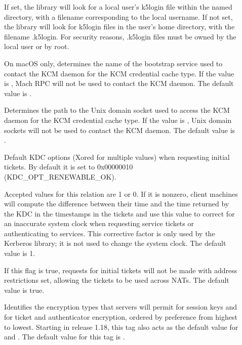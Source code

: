 \documentclass[letterpaper,10pt,english]{sphinxmanual}
\begin{document}
\begin{description}
\item[{}] \leavevmode
If set, the library will look for a local user’s k5login file
within the named directory, with a filename corresponding to the
local username.  If not set, the library will look for k5login
files in the user’s home directory, with the filename .k5login.
For security reasons, .k5login files must be owned by
the local user or by root.

\item[{}] \leavevmode
On macOS only, determines the name of the bootstrap service used to
contact the KCM daemon for the KCM credential cache type.  If the
value is \sphinxcode{-}, Mach RPC will not be used to contact the KCM
daemon.  The default value is .

\item[{}] \leavevmode
Determines the path to the Unix domain socket used to access the
KCM daemon for the KCM credential cache type.  If the value is
\sphinxcode{-}, Unix domain sockets will not be used to contact the KCM
daemon.  The default value is
.

\item[{}] \leavevmode
Default KDC options (Xored for multiple values) when requesting
initial tickets.  By default it is set to 0x00000010
(KDC\_OPT\_RENEWABLE\_OK).

\item[{}] \leavevmode
Accepted values for this relation are 1 or 0.  If it is nonzero,
client machines will compute the difference between their time and
the time returned by the KDC in the timestamps in the tickets and
use this value to correct for an inaccurate system clock when
requesting service tickets or authenticating to services.  This
corrective factor is only used by the Kerberos library; it is not
used to change the system clock.  The default value is 1.

\item[{}] \leavevmode
If this flag is true, requests for initial tickets will not be
made with address restrictions set, allowing the tickets to be
used across NATs.  The default value is true.

\item[{}] \leavevmode
Identifies the encryption types that servers will permit for
session keys and for ticket and authenticator encryption, ordered
by preference from highest to lowest.  Starting in release 1.18,
this tag also acts as the default value for
 and .  The
default value for this tag is .


\end{description}
\end{document}
